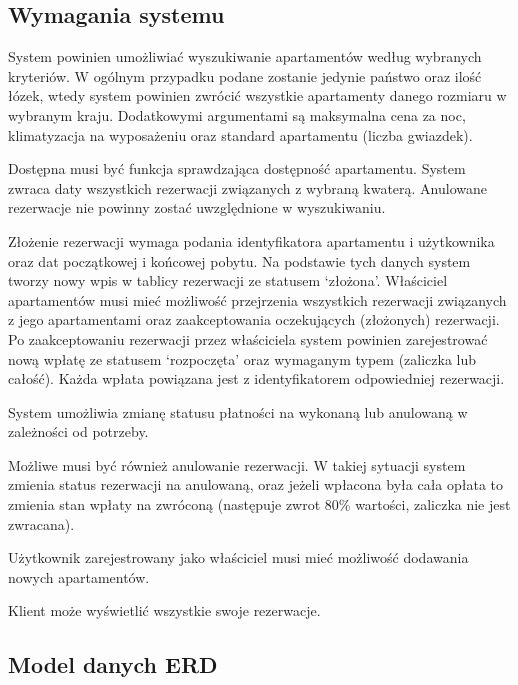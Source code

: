 \documentclass[polish, 11pt]{article}
\begin{document}
     

    \subsection{Wymagania systemu}
        System powinien umożliwiać wyszukiwanie apartamentów według wybranych kryteriów.
        W ogólnym przypadku podane zostanie jedynie państwo oraz ilość łózek,
        wtedy system powinien zwrócić wszystkie apartamenty danego rozmiaru w wybranym kraju.
        Dodatkowymi argumentami są maksymalna cena za noc,
        klimatyzacja na wyposażeniu oraz standard apartamentu (liczba gwiazdek).

        Dostępna musi być funkcja sprawdzająca dostępność apartamentu.
        System zwraca daty wszystkich rezerwacji związanych z wybraną kwaterą.
        Anulowane rezerwacje nie powinny zostać uwzględnione w wyszukiwaniu.

        Złożenie rezerwacji wymaga podania identyfikatora apartamentu i użytkownika oraz dat początkowej i końcowej pobytu.
        Na podstawie tych danych system tworzy nowy wpis w tablicy rezerwacji ze statusem `złożona'.
        Właściciel apartamentów musi mieć możliwość przejrzenia wszystkich rezerwacji związanych z jego apartamentami
        oraz zaakceptowania oczekujących (złożonych) rezerwacji.
        Po zaakceptowaniu rezerwacji przez właściciela system powinien zarejestrować nową wpłatę ze statusem `rozpoczęta'
        oraz wymaganym typem (zaliczka lub całość).
        Każda wpłata powiązana jest z identyfikatorem odpowiedniej rezerwacji.

        System umożliwia zmianę statusu płatności na wykonaną lub anulowaną w zależności od potrzeby.

        Możliwe musi być również anulowanie rezerwacji.
        W takiej sytuacji system zmienia status rezerwacji na anulowaną,
        oraz jeżeli wpłacona była cała opłata to zmienia stan wpłaty na zwróconą
        (następuje zwrot 80\% wartości, zaliczka nie jest zwracana).

        Użytkownik zarejestrowany jako właściciel musi mieć możliwość dodawania nowych apartamentów.
        
        Klient może wyświetlić wszystkie swoje rezerwacje.
    
    \subsection{Model danych ERD}
\end{document}
